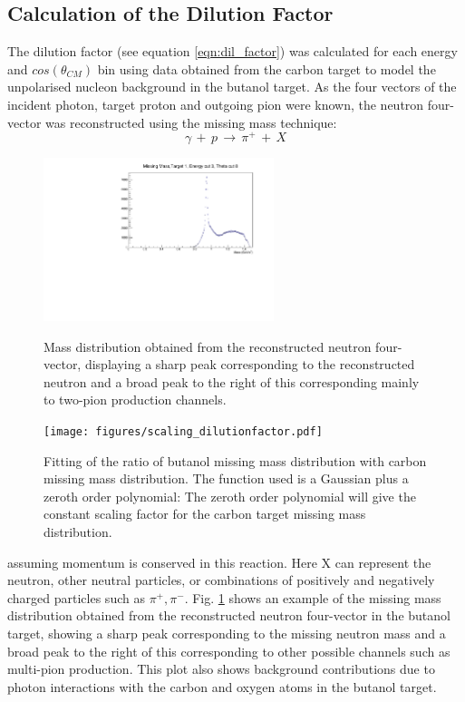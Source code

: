 \subsection{Calculation of the Dilution Factor}
\label{ch:dil_factor}
The dilution factor (see equation \ref{eqn:dil_factor}) was calculated for each energy and $cos(\theta_{CM})$ bin using data obtained from the carbon target to model the unpolarised nucleon background in the butanol target.
As the four vectors of the incident photon, target proton and outgoing pion were known, the neutron four-vector was reconstructed using the missing mass technique:
$$
\gamma \, + \,  p \, \rightarrow \, \pi^+ \, + \, X
$$
\begin{figure}[htb]
  \begin{center}
    \includegraphics[width=0.6\textwidth]{figures/neutron_missingmass.pdf} \\
    \caption{Mass distribution obtained from the reconstructed neutron four-vector, displaying a sharp peak corresponding to the reconstructed neutron and
a broad peak to the right of this corresponding mainly to two-pion production channels. }
    \label{fig:frost_neutronmissing_ex}
  \end{center}
\end{figure}
\begin{figure}[htb]
  \begin{center}
    \texttt{[image: figures/scaling\_dilutionfactor.pdf]} \\
    \caption{Fitting of the ratio of butanol missing mass distribution with carbon missing mass distribution. The function used is a Gaussian plus a zeroth order polynomial: The zeroth order polynomial will give the constant scaling factor for the carbon target missing mass distribution. }
    \label{fig:scaling_dilutionfactor}
  \end{center}
\end{figure}
assuming momentum is conserved in this reaction. Here X can represent the neutron, other neutral particles, or combinations of positively and negatively charged particles such as $\pi^+ , \pi^-$. Fig. \ref{fig:frost_neutronmissing_ex} shows an example of the missing mass distribution obtained from the reconstructed neutron four-vector in the butanol target, showing a sharp peak corresponding to the missing neutron mass and a broad peak to the right of this corresponding to other possible channels such as multi-pion production. This plot also shows background contributions due to photon interactions with the carbon and oxygen atoms in the butanol target.
